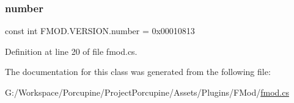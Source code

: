\subsubsection{\texorpdfstring{number}{number}}
{\footnotesize\ttfamily const int F\+M\+O\+D.\+V\+E\+R\+S\+I\+O\+N.\+number = 0x00010813}



Definition at line 20 of file fmod.\+cs.



The documentation for this class was generated from the following file\+:\begin{DoxyCompactItemize}
\item 
G\+:/\+Workspace/\+Porcupine/\+Project\+Porcupine/\+Assets/\+Plugins/\+F\+Mod/\hyperlink{fmod_8cs}{fmod.\+cs}\end{DoxyCompactItemize}
